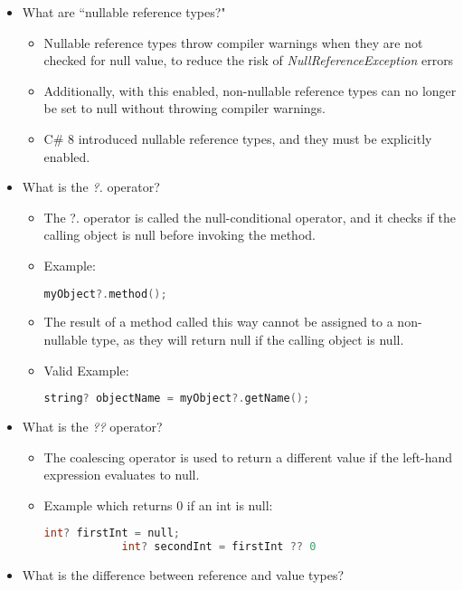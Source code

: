 \documentclass{article}
\begin{document}
\begin{itemize}
\begin{itemize}
    \end{itemize}
    \item What are ``nullable reference types?"
    \begin{itemize}
        \item Nullable reference types throw compiler warnings when they are not checked for null value, to reduce the risk of \textit{NullReferenceException} errors
        \item Additionally, with this enabled, non-nullable reference types can no longer be set to null without throwing compiler warnings.
        \item C\# 8 introduced nullable reference types, and they must be explicitly enabled.
    \end{itemize}
    \item What is the \textit{?.} operator?
    \begin{itemize}
        \item The ?. operator is called the null-conditional operator, and it checks if the calling object is null before invoking the method. 
        \item Example: \begin{lstlisting}[language=C++]
            myObject?.method(); \end{lstlisting}
        \item The result of a method called this way cannot be assigned to a non-nullable type, as they will return null if the calling object is null.
        \item Valid Example:
            \begin{lstlisting}[language=C++]
            string? objectName = myObject?.getName(); \end{lstlisting} 
    \end{itemize}
    \item What is the \textit{??} operator?
    \begin{itemize}
        \item The coalescing operator is used to return a different value if the left-hand expression evaluates to null.
        \item Example which returns 0 if an int is null:
        \begin{lstlisting}[language=C++]
            int? firstInt = null;
            int? secondInt = firstInt ?? 0\end{lstlisting} 
    \end{itemize}
    \item What is the difference between reference and value types?

\end{itemize}
\end{document}
